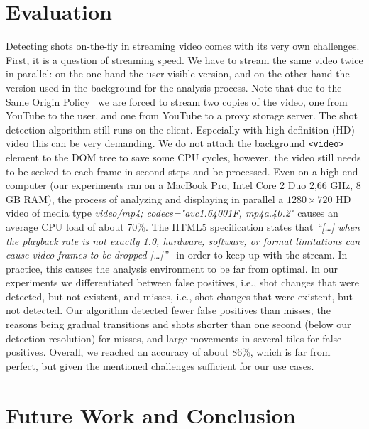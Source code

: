 \documentclass{acm_proc_article-sp}
\begin{document}
\section{Evaluation} \label{sec:evaluation}
Detecting shots on-the-fly in streaming video comes with its very own challenges. First, it is a question of streaming speed. We have to stream the same video twice in parallel: on the one hand the user-visible version, and on the other hand the version used in the background for the analysis process. Note that due to the Same Origin Policy~\cite{sameoriginpolicy} we are forced to stream two copies of the video, one from YouTube to the user, and one from YouTube to a proxy storage server. The shot detection algorithm still runs on the client. Especially with high-definition (HD) video this can be very demanding. We do not attach the background \texttt{<video>} element to the DOM tree to save some CPU cycles, however, the video still needs to be seeked to each frame in second-steps and be processed. Even on a high-end computer (our experiments ran on a MacBook Pro, Intel Core 2 Duo 2,66 GHz, 8 GB RAM), the process of analyzing and displaying in parallel a $\mathit{1280} \times \mathit{720}$ HD video of media type \emph{video/mp4; codecs="avc1.64001F, mp4a.40.2"} causes an average CPU load of about 70\%. The HTML5 specification states that \textit{``[\ldots] when the playback rate is not exactly 1.0, hardware, software, or format limitations can cause video frames to be dropped [\ldots]''}~\cite{whatwgvideo} in order to keep up with the stream. In practice, this causes the analysis environment to be far from optimal. In our experiments we differentiated between false positives, i.e., shot changes that were detected, but not existent, and misses, i.e., shot changes that were existent, but not detected. Our algorithm detected fewer false positives than misses, the reasons being gradual transitions and shots shorter than one second (below our detection resolution) for misses, and large movements in several tiles for false positives. Overall, we reached an accuracy of about 86\%, which is far from perfect, but given the mentioned challenges sufficient for our use cases. 

\section{Future Work and Conclusion} \label{sec:future-work-conclusion}
\end{document}
